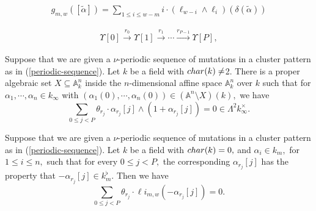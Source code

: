 \documentclass[10pt,a4paper]{amsart}
\begin{document}
\begin{eqnarray}\label{dilog-formula}
 g_{m,w} ([\tilde{\alpha}]) =\sum _{1\leq i \leq w-m} i \cdot (\ell _{w-i} \wedge \ell _{i})(\delta(\tilde{\alpha}))   
\end{eqnarray}

\begin{eqnarray}\label{periodic-sequence}
\Upsilon[0] \xrightarrow{r_0} \Upsilon[1] \xrightarrow{r_1} \cdots \xrightarrow{r_{P-1}} \Upsilon[P],   
\end{eqnarray}

\begin{lemma}\label{lemma}
Suppose that we are given a $\nu$-periodic sequence of mutations in a cluster pattern as in (\ref{periodic-sequence}). Let $k$ be a field with   ${\rm char}(k)\neq$2. There is a proper algebraic set $X \subseteq \mathbb{A}^{n}_{k}$ inside the $n$-dimensional affine space $\mathbb{A}^{n}_{k}$ over $k$ such that for ${\alpha}_{1}, \cdots, {\alpha} _{n} \in k_{\infty} $ with $({\alpha}_{1}(0), \cdots, {\alpha} _{n} (0)) \in (\mathbb{A}^n \setminus X)(k),$ we have 
$$
\sum_{0\leq j <P}\theta _{r_{j}}\cdot {\alpha} _{r_j}[j] \wedge (1 +{\alpha} _{r_j}[j])=0 \in \Lambda ^{2} k_{\infty} ^{\times}.   
 $$
 
\end{lemma}

\begin{theorem}\label{theorem-0-identity} Suppose that we are given a $\nu$-periodic sequence of mutations in a cluster pattern as in (\ref{periodic-sequence}). Let  $k$ be a field with ${\rm char}(k)=0,$   and  $\alpha_i \in k_{m} ,$ for $1\leq i \leq n,$ such that   for every $0 \leq j <P,$ the corresponding $\alpha _{r_j}[j]$ has the property that $-\alpha_{r_j}[j]  \in k_{m} ^{\flat}.$  Then  we have  
$$
\sum _{0\leq j <P} \theta_{r_j}\cdot \ell i _{m,w}(-\alpha_{r_j}[j])=0.
 $$

    
\end{theorem}
\end{document}
